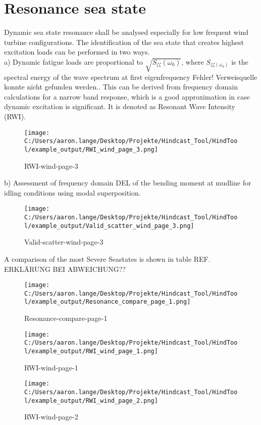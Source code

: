 
\section{Resonance sea state }

Dynamic sea state resonance shall be analysed especially for low frequent wind turbine configurations. The identification of the sea state that creates highest excitation loads can be performed in two ways.\\
a) Dynamic fatigue loads are proportional to $\sqrt{S_{\zeta \zeta}\left(\omega_{0}\right)}$, where $S_{\zeta \zeta\left(\omega_{0}\right)}$ is the spectral energy of the wave spectrum at first eigenfrequency Fehler! Verweisquelle konnte nicht gefunden werden.. This can be derived from frequency domain calculations for a narrow band response, which is a good approximation in case dynamic excitation is significant. It is denoted as Resonant Wave Intensity (RWI).\\

\begin{figure}[H] 
 \centering 
 \texttt{[image: C:/Users/aaron.lange/Desktop/Projekte/Hindcast\_Tool/HindTool/example\_output/RWI\_wind\_page\_3.png]} 
 \caption{ RWI-wind-page-3 } 
 \label{fig: RWI_wind_page_3 } 
\end{figure}
b) Assessment of frequency domain DEL of the bending moment at mudline for idling conditions using modal superposition.\\

\begin{figure}[H] 
 \centering 
 \texttt{[image: C:/Users/aaron.lange/Desktop/Projekte/Hindcast\_Tool/HindTool/example\_output/Valid\_scatter\_wind\_page\_3.png]} 
 \caption{ Valid-scatter-wind-page-3 } 
 \label{fig: Valid_scatter_wind_page_3 } 
\end{figure}

A comparison of the most Severe Seastates is shown in table REF. ERKLÄRUNG BEI ABWEICHUNG??
\begin{figure}[H] 
 \centering 
 \texttt{[image: C:/Users/aaron.lange/Desktop/Projekte/Hindcast\_Tool/HindTool/example\_output/Resonance\_compare\_page\_1.png]} 
 \captionsetup{type=table} 
\caption{ Resonance-compare-page-1 } 
 \label{tab: Resonance_compare_page_1 } 
\end{figure}

\begin{figure}[H] 
 \centering 
 \texttt{[image: C:/Users/aaron.lange/Desktop/Projekte/Hindcast\_Tool/HindTool/example\_output/RWI\_wind\_page\_1.png]} 
 \caption{ RWI-wind-page-1 } 
 \label{fig: RWI_wind_page_1 } 
\end{figure}
\begin{figure}[H] 
 \centering 
 \texttt{[image: C:/Users/aaron.lange/Desktop/Projekte/Hindcast\_Tool/HindTool/example\_output/RWI\_wind\_page\_2.png]} 
 \caption{ RWI-wind-page-2 } 
 \label{fig: RWI_wind_page_2 } 
\end{figure}

